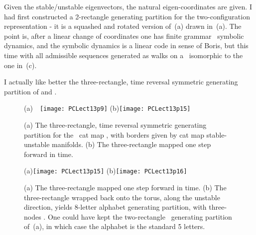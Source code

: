 Given the stable/unstable eigenvectors, the
natural eigen-coordinates are given. I had first constructed a
2-rectangle generating partition for the \PV{}
two-configuration representation  - it is a squashed
and rotated version of \,(a)
drawn in \,(a). The point is, after a
linear change of coordinates one has finite grammar \AW\ symbolic
dynamics, and the symbolic dynamics is a linear code in sense of Boris,
but this time with all admissible sequences generated as walks on
a \markGraph\ isomorphic to the one in \,(c).

I actually like better the three-rectangle, time reversal symmetric
generating partition of  and .

\begin{figure}
  \centering
(a)~~\texttt{[image: PCLect13p9]}
(b)\texttt{[image: PCLect13p15]}
  \caption{\label{fig:PCLect13p9}
(a) The three-rectangle, time reversal symmetric generating partition
for the \PV\ cat map , with borders given by cat
map stable-unstable manifolds.
(b) The three-rectangle mapped one step forward in time.
}
\end{figure}

\begin{figure}
  \centering
(a)\texttt{[image: PCLect13p15]}
(b)\texttt{[image: PCLect13p16]}
  \caption{\label{fig:PCLect13p16}
(a) The three-rectangle mapped one step forward in time.
(b) The three-rectangle wrapped back onto the torus, along the unstable
direction, yields 8-letter alphabet generating partition, with three-nodes
\markGraph.
One could have kept the two-rectangle \AW\ generating partition of
\,(a), in which case the alphabet is the standard 5
letters.
}
\end{figure}

